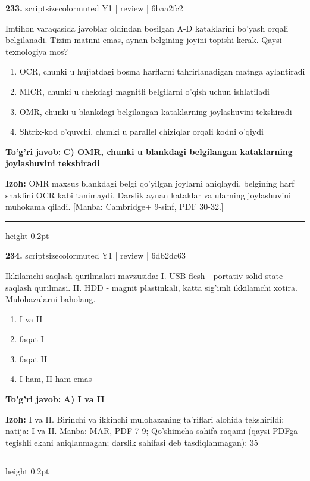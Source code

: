 \documentclass[10pt,a4paper]{article}
\begin{document}
{\bfseries\sffamily\color{ink} 233.} {scriptsizecolor{muted} Y1 | review | 6baa2fc2}
\par
Imtihon varaqasida javoblar oldindan bosilgan A-D kataklarini bo'yash orqali belgilanadi. Tizim matnni emas, aynan belgining joyini topishi kerak. Qaysi texnologiya mos?
\begin{enumerate}[label=\Alph*),leftmargin=9mm]
\item OCR, chunki u hujjatdagi bosma harflarni tahrirlanadigan matnga aylantiradi
\item MICR, chunki u chekdagi magnitli belgilarni o'qish uchun ishlatiladi
\item OMR, chunki u blankdagi belgilangan kataklarning joylashuvini tekshiradi
\item Shtrix-kod o'quvchi, chunki u parallel chiziqlar orqali kodni o'qiydi
\end{enumerate}
\begin{tcolorbox}[enhanced,breakable,colback=teal!4,colframe=teal!60!black,boxrule=0.45pt,arc=1.2mm,left=2.7mm,right=2.7mm,top=1.8mm,bottom=1.8mm,before skip=2mm,after skip=2mm]
{\bfseries\sffamily\color{teal}To'g'ri javob:} \textbf{C) OMR, chunki u blankdagi belgilangan kataklarning joylashuvini tekshiradi}
\par\smallskip
{\bfseries Izoh:} OMR maxsus blankdagi belgi qo'yilgan joylarni aniqlaydi, belgining harf shaklini OCR kabi tanimaydi. Darslik aynan kataklar va ularning joylashuvini muhokama qiladi. [Manba: Cambridge+ 9-sinf, PDF 30-32.]
\end{tcolorbox}
\vspace{2mm}\hrule height 0.2pt\vspace{3mm}

{\bfseries\sffamily\color{ink} 234.} {scriptsizecolor{muted} Y1 | review | 6db2dc63}
\par
Ikkilamchi saqlash qurilmalari mavzusida: I. USB flesh - portativ solid-state saqlash qurilmasi. II. HDD - magnit plastinkali, katta sig'imli ikkilamchi xotira. Mulohazalarni baholang.
\begin{enumerate}[label=\Alph*),leftmargin=9mm]
\item I va II
\item faqat I
\item faqat II
\item I ham, II ham emas
\end{enumerate}
\begin{tcolorbox}[enhanced,breakable,colback=teal!4,colframe=teal!60!black,boxrule=0.45pt,arc=1.2mm,left=2.7mm,right=2.7mm,top=1.8mm,bottom=1.8mm,before skip=2mm,after skip=2mm]
{\bfseries\sffamily\color{teal}To'g'ri javob:} \textbf{A) I va II}
\par\smallskip
{\bfseries Izoh:} I va II. Birinchi va ikkinchi mulohazaning ta'riflari alohida tekshirildi; natija: I va II. Manba: MAR, PDF 7-9; Qo'shimcha sahifa raqami (qaysi PDFga tegishli ekani aniqlanmagan; darslik sahifasi deb tasdiqlanmagan): 35
\end{tcolorbox}
\vspace{2mm}\hrule height 0.2pt\vspace{3mm}
\end{document}
